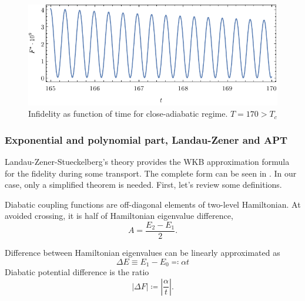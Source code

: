 \begin{figure}[H]
    \centering
    \includegraphics[scale=1.2]{../img/overcritical.pdf}
    \caption{Infidelity as function of time for close-adiabatic regime. $T=170>T_c$}
    \label{fig:overcritical}
\end{figure}

\subsubsection{Exponential and polynomial part, Landau-Zener and APT}
Landau-Zener-Stueckelberg's theory provides the WKB approximation formula for the fidelity during some transport. The complete form can be seen in \cite{nonadiabaticTransition}. In our case, only a simplified theorem is needed. First, let's review some definitions.

\begin{definition}
    Diabatic coupling functions are off-diagonal elements of two-level Hamiltonian. At avoided crossing, it is half of Hamiltonian eigenvalue difference,
    \begin{equation}
        A=\frac{E_2-E_1}{2}.
    \end{equation}
\end{definition}
\begin{definition}
    Difference between Hamiltonian eigenvalues can be linearly approximated as
    \begin{equation}
        \Delta E\equiv E_1-E_0 \eqqcolon \alpha t
    \end{equation}
    Diabatic potential difference is the ratio
    \begin{equation}
        |\Delta F|\coloneqq \left|\frac{\alpha}{t}\right|.
    \end{equation}
\end{definition}

